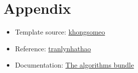 \section{Appendix}
\begin{itemize}
\item Template source: \href{https://github.com/khongsomeo/hcmus-unofficial-report-template}{khongsomeo} 
\item Reference: \href{https://github.com/tranlynhathao/fit-vnuhcmus_template}{tranlynhathao}
\item Documentation: \href{https://mirror.unpad.ac.id/ctan/macros/latex/contrib/algorithms/algorithms.pdf}{The algorithms bundle}
\end{itemize}